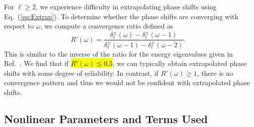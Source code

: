 \documentclass[preprint,showpacs,showkeys,preprintnumbers,amsmath,amssymb,longbibliography,pra,aps]{revtex4-1}
\begin{document}
For $\ell \geq 2$, we experience difficulty in extrapolating phase shifts
using Eq.~(\ref{eq:Extrap}). To determine whether the phase shifts are
converging with respect to $\omega$, we compute a convergence ratio defined as
\begin{equation}
\label{eq:ConvRatio}
R'(\omega) = \frac{\delta_\ell^\pm(\omega)-\delta_\ell^\pm(\omega-1)}
  {\delta_\ell^\pm(\omega-1)-\delta_\ell^\pm(\omega-2)}.
\end{equation}
This is similar to the inverse of the ratio for the energy eigenvalues given in
Ref.~\cite{Yan1999}. We find that if \hl{$R'(\omega) \lesssim 0.5$}, we can typically 
obtain extrapolated phase shifts with some degree of reliability. In contrast,
if $R'(\omega) \geq 1$, there is no convergence pattern and thus we would not
be confident with extrapolated phase shifts.


\subsection{Nonlinear Parameters and Terms Used}
\label{sec:Parameters}

\end{document}
